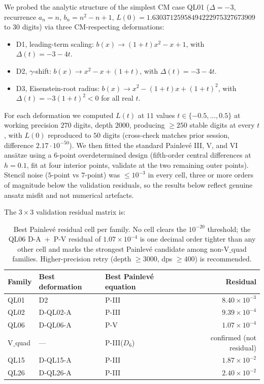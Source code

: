\documentclass[12pt]{amsart}
\theoremstyle{definition}
\begin{document}
We probed the analytic structure of the simplest CM case QL01
($\Delta=-3$, recurrence $a_{n}=n$, $b_{n}=n^{2}-n+1$,
$L(0)=1.63037125958494222975327673909$ to $30$ digits) via three
CM-respecting deformations:
\begin{itemize}
\item D1, leading-term scaling: $b(x)\to (1+t)x^{2}-x+1$, with
$\Delta(t)=-3-4t$.
\item D2, $\gamma$-shift: $b(x)\to x^{2}-x+(1+t)$, with
$\Delta(t)=-3-4t$.
\item D3, Eisenstein-root radius: $b(x)\to x^{2}-(1+t)x+(1+t)^{2}$, with
$\Delta(t)=-3(1+t)^{2}<0$ for all real $t$.
\end{itemize}
For each deformation we computed $L(t)$ at $11$ values
$t\in\{-0.5,\ldots,0.5\}$ at working precision $270$ digits, depth $2000$,
producing $\ge 250$ stable digits at every $t$, with $L(0)$ reproduced to
$50$ digits (cross-check matches prior session, difference
$2.17\cdot 10^{-50}$). We then fitted the standard Painlev\'e III, V, and
VI ans\"atze using a $6$-point overdetermined design (fifth-order central
differences at $h=0.1$, fit at four interior points, validate at the two
remaining outer points). Stencil noise ($5$-point vs $7$-point) was
$\le 10^{-3}$ in every cell, three or more orders of magnitude below the
validation residuals, so the results below reflect genuine ansatz misfit
and not numerical artefacts.

The $3\times 3$ validation residual matrix is:
\begin{table}[h]
\centering
\begin{tabular}{lllr}
\toprule
Family & Best deformation & Best Painlev\'e equation & Residual \\
\midrule
QL01      & D2        & P-III           & $8.40\times 10^{-3}$ \\
QL02      & D-QL02-A  & P-III           & $9.39\times 10^{-4}$ \\
QL06      & D-QL06-A  & P-V             & $1.07\times 10^{-4}$ \\
V$\_$quad & ---       & P-III($D_{6}$)  & confirmed (not residual) \\
QL15      & D-QL15-A  & P-III           & $1.87\times 10^{-2}$ \\
QL26      & D-QL26-A  & P-III           & $2.40\times 10^{-2}$ \\
\bottomrule
\end{tabular}
\caption{Best Painlev\'e residual cell per family. No cell clears
the $10^{-20}$ threshold; the QL06 D-A~+~P-V residual of
$1.07\times 10^{-4}$ is one decimal order tighter than any other
cell and marks the strongest Painlev\'e candidate among non-V$\_$quad
families. Higher-precision retry (depth $\ge 3000$, dps $\ge 400$) is
recommended.}
\label{tab:residuals}
\end{table}
\end{document}
